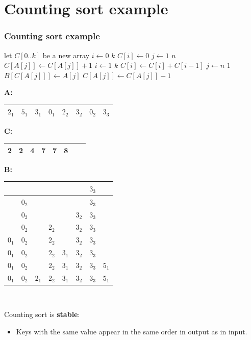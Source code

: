 \documentclass{beamer}
\newcommand{\bi}{\begin{itemize}}
\newcommand{\ii}{\item}
\newcommand{\ei}{\end{itemize}}
\newcommand{\sect}[1]{
\section{#1}
\begin{frame}[fragile]\frametitle{#1}
}
\begin{document}
\sect{Counting sort example}
\begin{multicols}{2}
\begin{codebox}
  \li let $C[0..k]$ be a new array
  \li \For $i\gets 0$ \To $k$ \Do
  \li $C[i] \gets 0$ \End
  \li \For $j\gets 1$ \To $n$ \Do
  \li $C[A[j]] \gets C[A[j]]+1$ \End
  \li \For $i\gets 1$ \To $k$ \Do
  \li $C[i] \gets C[i] + C[i-1]$ \End
  \li \For $j \gets n$ \Downto $1$ \Do
  \li $B[C[A[j]]] \gets A[j]$
  \li $C[A[j]] \gets C[A[j]]-1$ \End
\End
\end{codebox}
\columnbreak

{\small

{\bf A:}
\begin{tabular}{|c|c|c|c|c|c|c|c|}\hline
 $2_1$ & $5_1$ & $3_1$ & $0_1$ & $2_2$ & $3_2$ & $0_2$ & $3_3$ \\\hline
\end{tabular}

\vfill

{\bf C:}
\begin{tabular}{|c|c|c|c|c|c|c|c|}\hline
 2 & 2 & 4 & 7 & 7 & 8\\\hline
  \end{tabular}

\vfill

{\bf B:}
\begin{tabular}{|c|c|c|c|c|c|c|c|}\hline
 & & & & & & $3_3$ & \\\hline
 & $0_2$ & & & & & $3_3$ & \\\hline
 & $0_2$ & & & & $3_2$ & $3_3$ & \\\hline
 & $0_2$ & & $2_2$ & & $3_2$ & $3_3$ & \\\hline
$0_1$ & $0_2$ & & $2_2$ & & $3_2$ & $3_3$ & \\\hline
$0_1$ & $0_2$ & & $2_2$ & $3_1$ & $3_2$ & $3_3$ & \\\hline
$0_1$ & $0_2$ & & $2_2$ & $3_1$ & $3_2$ & $3_3$ & $5_1$\\\hline
$0_1$ & $0_2$ & $2_1$ & $2_2$ & $3_1$ & $3_2$ & $3_3$ & $5_1$\\\hline
\end{tabular}\\

}

\end{multicols}

 Counting sort is {\bf stable}:
\bi
\ii Keys with the same value appear in the same order
in output as in input.
\ei
\end{frame}
\end{document}
